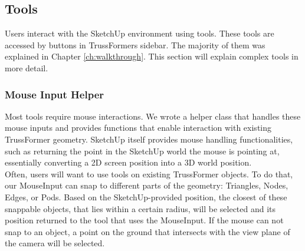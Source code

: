 \subsection{Tools}
Users interact with the SketchUp environment using tools. These tools are accessed by buttons in TrussFormers sidebar. The majority of them was explained in Chapter \ref{ch:walkthrough}. This section will explain complex tools in more detail.

\subsubsection{Mouse Input Helper}
Most tools require mouse interactions. We wrote a helper class that handles these mouse inputs and provides functions that enable interaction with existing TrussFormer geometry. SketchUp itself provides mouse handling functionalities, such as returning the point in the SketchUp world the mouse is pointing at, essentially converting a 2D screen position into a 3D world position.\\
Often, users will want to use tools on existing TrussFormer objects. To do that, our MouseInput can snap to different parts of the geometry: Triangles, Nodes, Edges, or Pods. Based on the SketchUp-provided position, the closest of these snappable objects, that lies within a certain radius, will be selected and its position returned to the tool that uses the MouseInput. If the mouse can not snap to an object, a point on the ground that intersects with the view plane of the camera will be selected.

